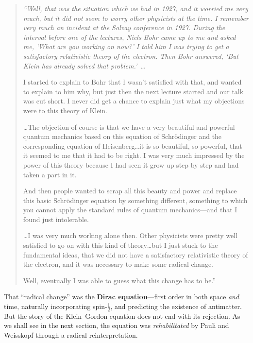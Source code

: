 \documentclass[12pt, a4paper]{article}
\theoremstyle{definition}
\begin{document}
\begin{quote}\itshape\color{quoteblue}
``Well, that was the situation which we had in 1927, and it worried me very
much, but it did not seem to worry other physicists at the time.  I remember
very much an incident at the Solvay conference in 1927.  During the interval
before one of the lectures, Niels Bohr came up to me and asked me, `What are
you working on now?'  I told him I was trying to get a satisfactory
relativistic theory of the electron.  Then Bohr answered, `But Klein has
already solved that problem.'~\ldots

I started to explain to Bohr that I wasn't satisfied with that, and wanted to
explain to him why, but just then the next lecture started and our talk was
cut short.  I never did get a chance to explain just what my objections were
to this theory of Klein.

\ldots\;The objection of course is that we have a very beautiful and powerful
quantum mechanics based on this equation of Schr\"{o}dinger and the
corresponding equation of Heisenberg\ldots\;it is so beautiful, so powerful,
that it seemed to me that it had to be right.  I was very much impressed by
the power of this theory because I had seen it grow up step by step and had
taken a part in it.

And then people wanted to scrap all this beauty and power and replace this
basic Schr\"{o}dinger equation by something different, something to which you
cannot apply the standard rules of quantum mechanics---and that I found just
intolerable.

\ldots\;I was very much working alone then.  Other physicists were pretty
well satisfied to go on with this kind of theory\ldots\;but I just stuck to
the fundamental ideas, that we did not have a satisfactory relativistic
theory of the electron, and it was necessary to make some radical change.

Well, eventually I was able to guess what this change has to be.''
\end{quote}

\noindent
That ``radical change'' was the \textbf{Dirac equation}---first order in both
space \emph{and} time, naturally incorporating spin-$\tfrac{1}{2}$, and
predicting the existence of antimatter.  But the story of the Klein--Gordon
equation does not end with its rejection.  As we shall see in the next
section, the equation was \emph{rehabilitated} by Pauli and Weisskopf through
a radical reinterpretation.

\end{document}
